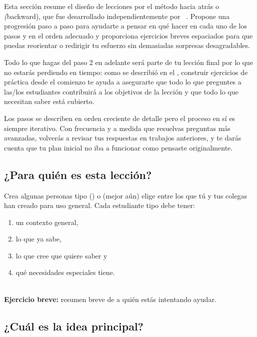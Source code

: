 
Esta sección resume el diseño de lecciones por el método hacia atrás o \emph(backward),
que fue desarrollado independientemente por ~\cite{Wigg2005,Bigg2011,Fink2013}.
Propone una progresión paso a paso
para ayudarte a pensar en qué hacer en cada uno de los pasos y en el orden adecuado
y proporciona ejercicios breves espaciados
para que puedas reorientar o redirigir tu esfuerzo sin demasiadas sorpresas desagradables.

Todo lo que hagas del paso 2 en adelante será parte de tu lección final
por lo que no estarás perdiendo en tiempo:
como se describió en el ,
construir ejercicios de práctica desde el comienzo te ayuda a asegurarte que
todo lo que preguntes a las/los estudiantes contribuirá a los objetivos de la lección
y que todo lo que necesitan saber está cubierto.

Los pasos se describen en orden creciente de detalle
pero el proceso en sí es siempre iterativo.
Con frecuencia y a medida que resuelvas preguntas más avanzadas,  volverás a revisar tus respuestas en trabajos anteriores, 
y te darás cuenta que tu plan inicial no iba a funcionar como pensaste originalmente.

\subsection*{¿Para quién es esta lección?}

Crea algunas personas tipo ()
o (mejor aún) elige entre los que tú y tus colegas han creado para uso general.
Cada estudiante tipo debe tener:

\begin{enumerate}

\item
  un contexto general,

\item
  lo que ya sabe,

\item
  lo que cree que quiere saber y

\item
  qué necesidades especiales tiene.

\end{enumerate}

~\\
\noindent
\textbf{Ejercicio breve:} resumen breve de a quién estás intentando ayudar.

\subsection*{¿Cuál es la idea principal?}


